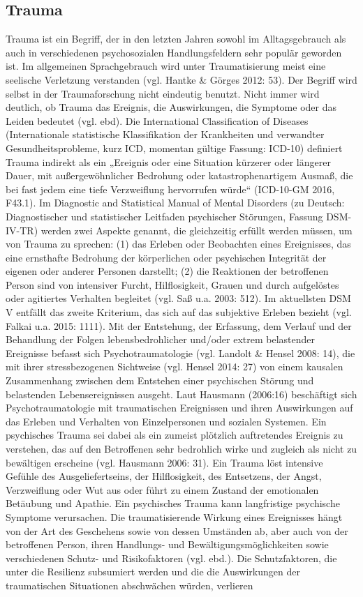 \subsection{Trauma}
Trauma ist ein Begriff, der in den letzten Jahren sowohl im Alltagsgebrauch als auch in verschiedenen psychosozialen Handlungsfeldern sehr populär geworden ist. Im allgemeinen Sprachgebrauch wird unter Traumatisierung meist eine seelische Verletzung verstanden (vgl. Hantke \& Görges 2012: 53). Der Begriff wird selbst in der Traumaforschung nicht eindeutig benutzt. Nicht immer wird deutlich, ob Trauma das Ereignis, die Auswirkungen, die Symptome oder das Leiden bedeutet (vgl. ebd). Die International Classification of Diseases (Internationale statistische Klassifikation der Krankheiten und verwandter Gesundheitsprobleme, kurz ICD, momentan gültige Fassung: ICD-10) definiert Trauma indirekt als ein „Ereignis oder eine Situation kürzerer oder längerer Dauer, mit außergewöhnlicher Bedrohung oder katastrophenartigem Ausmaß, die bei fast jedem eine tiefe Verzweiflung hervorrufen würde“ (ICD-10-GM 2016, F43.1). Im Diagnostic and Statistical Manual of Mental Disorders (zu Deutsch: Diagnostischer und statistischer Leitfaden psychischer Störungen, Fassung DSM-IV-TR) werden zwei Aspekte genannt, die gleichzeitig erfüllt werden müssen, um von Trauma zu sprechen: (1) das Erleben oder Beobachten eines Ereignisses, das eine ernsthafte Bedrohung der körperlichen oder psychischen Integrität der eigenen oder anderer Personen darstellt; (2) die Reaktionen der betroffenen Person sind von intensiver Furcht, Hilflosigkeit, Grauen und durch aufgelöstes oder agitiertes Verhalten begleitet (vgl. Saß u.a. 2003: 512). Im aktuellsten DSM V entfällt das zweite Kriterium, das sich auf das subjektive Erleben bezieht (vgl. Falkai u.a. 2015: 1111). Mit der Entstehung, der Erfassung, dem Verlauf und der Behandlung der Folgen lebensbedrohlicher und/oder extrem belastender Ereignisse befasst sich Psychotraumatologie (vgl. Landolt \& Hensel 2008: 14), die mit ihrer stressbezogenen Sichtweise (vgl. Hensel 2014: 27) von einem kausalen Zusammenhang zwischen dem Entstehen einer psychischen Störung und belastenden Lebensereignissen ausgeht. Laut Hausmann (2006:16) beschäftigt sich Psychotraumatologie mit traumatischen Ereignissen und ihren Auswirkungen auf das Erleben und Verhalten von Einzelpersonen und sozialen Systemen. Ein psychisches Trauma sei dabei als ein zumeist plötzlich auftretendes Ereignis zu verstehen, das auf den Betroffenen sehr bedrohlich wirke und zugleich als nicht zu bewältigen erscheine (vgl. Hausmann 2006: 31). Ein Trauma löst intensive Gefühle des Ausgeliefertseins, der Hilflosigkeit, des Entsetzens, der Angst, Verzweiflung oder Wut aus oder führt zu einem Zustand der emotionalen Betäubung und Apathie. Ein psychisches Trauma kann langfristige psychische Symptome verursachen. Die traumatisierende Wirkung eines Ereignisses hängt von der Art des Geschehens sowie von dessen Umständen ab, aber auch von der betroffenen Person, ihren Handlungs- und Bewältigungsmöglichkeiten sowie verschiedenen Schutz- und Risikofaktoren (vgl. ebd.). Die Schutzfaktoren, die unter die Resilienz subsumiert werden und die die Auswirkungen der traumatischen Situationen abschwächen würden, verlieren 